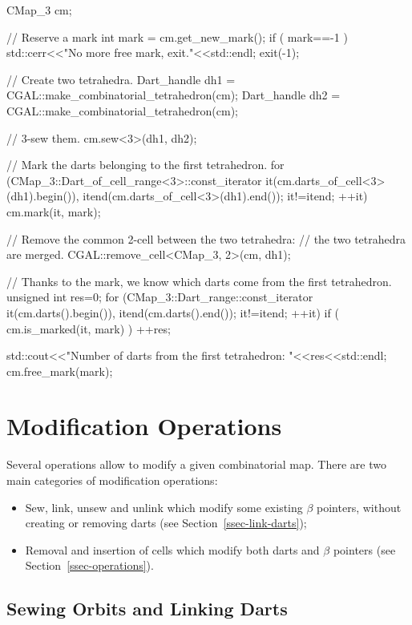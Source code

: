 \begin{ccAdvanced}
\begin{ccExampleCode}
  CMap_3 cm;
  
  // Reserve a mark
  int mark = cm.get_new_mark();
  if ( mark==-1 )
    {
      std::cerr<<"No more free mark, exit."<<std::endl;
      exit(-1);
    }
  
  // Create two tetrahedra.
  Dart_handle dh1 = CGAL::make_combinatorial_tetrahedron(cm);  
  Dart_handle dh2 = CGAL::make_combinatorial_tetrahedron(cm);

  // 3-sew them.
  cm.sew<3>(dh1, dh2);
  
  // Mark the darts belonging to the first tetrahedron.
  for  (CMap_3::Dart_of_cell_range<3>::const_iterator 
          it(cm.darts_of_cell<3>(dh1).begin()),
          itend(cm.darts_of_cell<3>(dh1).end()); it!=itend; ++it)
    cm.mark(it, mark);

  // Remove the common 2-cell between the two tetrahedra:
  // the two tetrahedra are merged.
  CGAL::remove_cell<CMap_3, 2>(cm, dh1);

  // Thanks to the mark, we know which darts come from the first tetrahedron.
  unsigned int res=0;
  for (CMap_3::Dart_range::const_iterator it(cm.darts().begin()),
	 itend(cm.darts().end()); it!=itend; ++it)
    {
      if ( cm.is_marked(it, mark) )
	++res;
    }
  
  std::cout<<"Number of darts from the first tetrahedron: "<<res<<std::endl;
  cm.free_mark(mark);
\end{ccExampleCode}

\end{ccAdvanced}

\section{Modification Operations}

Several operations allow to modify a given combinatorial map.
There are two main categories of modification operations:
\begin{itemize}
\item Sew, link, unsew and unlink which modify some existing $\beta$
  pointers, without creating or removing darts (see
  Section~\ref{ssec-link-darts});
\item Removal and insertion of cells which modify both darts and
  $\beta$ pointers (see Section~\ref{ssec-operations}).
\end{itemize}
%

\subsection{Sewing Orbits and Linking Darts \label{ssec-link-darts}}

